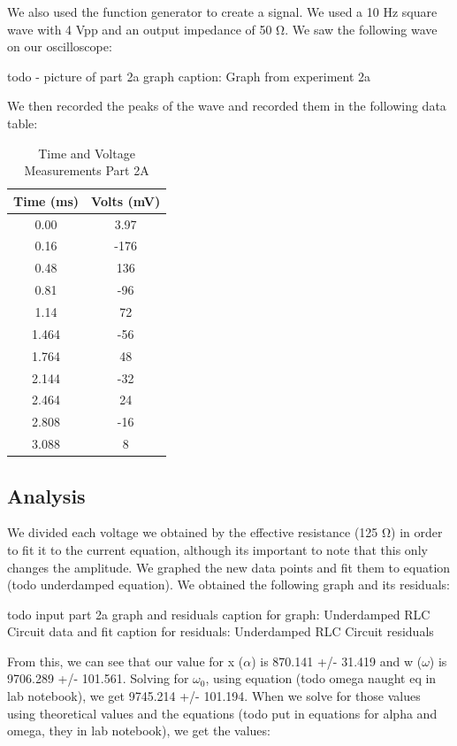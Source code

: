 \documentclass[11pt]{article}
\begin{document}
    We also used the function generator to create a signal. We used a 10 Hz square wave with 4 Vpp and an output impedance of 50 Ω. We saw the following wave on our oscilloscope:

    todo - picture of part 2a graph
    caption: Graph from experiment 2a

    We then recorded the peaks of the wave and recorded them in the following data table:

    \begin{table}[h]
        \centering
        \caption{Time and Voltage Measurements Part 2A}
        \begin{tabular}{cc}
            \toprule
            \textbf{Time (ms)} & \textbf{Volts (mV)} \\
            \midrule
            0.00 & 3.97 \\
            0.16 & -176 \\
            0.48 & 136 \\
            0.81 & -96 \\
            1.14 & 72 \\
            1.464 & -56 \\
            1.764 & 48 \\
            2.144 & -32 \\
            2.464 & 24 \\
            2.808 & -16 \\
            3.088 & 8 \\
            \bottomrule
        \end{tabular}
    \end{table}



    \subsection{Analysis}\label{subsec:part2a_analysis}
    We divided each voltage we obtained by the effective resistance (125 Ω)  in order to fit it to the current equation, although its important to note that this only changes the amplitude. We graphed the new data points and fit them to equation (todo underdamped equation). We obtained the following graph and its residuals:

    todo input part 2a graph and residuals
    caption for graph: Underdamped RLC Circuit data and fit
    caption for residuals: Underdamped RLC Circuit residuals

    From this, we can see that our value for x (\( \alpha \)) is 870.141 +/- 31.419 and w (\( \omega \)) is 9706.289 +/- 101.561. Solving for \( \omega_0 \), using equation (todo omega naught eq in lab notebook), we get 9745.214 +/- 101.194. When we solve for those values using theoretical values and the equations (todo put in equations for alpha and omega, they in lab notebook), we get the values:
\end{document}
